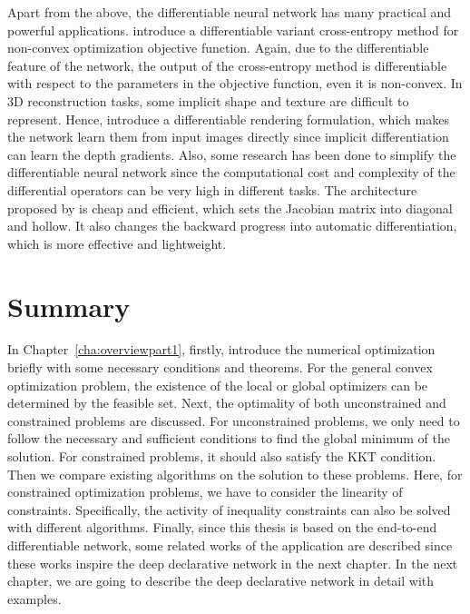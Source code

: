 \par Apart from the above, the differentiable neural network has many practical and powerful applications. \cite{AB:19} introduce a differentiable variant cross-entropy method for non-convex optimization objective function. Again, due to the differentiable feature of the network, the output of the cross-entropy method is differentiable with respect to the parameters in the objective function, even it is non-convex. In 3D reconstruction tasks, some implicit shape and texture are difficult to represent. Hence, \cite{NM:20} introduce a differentiable rendering formulation, which makes the network learn them from input images directly since implicit differentiation can learn the depth gradients. Also, some research has been done to simplify the differentiable neural network since the computational cost and complexity of the differential operators can be very high in different tasks. The architecture proposed by \cite{CR:19} is cheap and efficient, which sets the Jacobian matrix into diagonal and hollow. It also changes the backward progress into automatic differentiation, which is more effective and lightweight. 


\section{Summary}
\label{sec:2summary}
In Chapter~\ref{cha:overviewpart1}, firstly, introduce the numerical optimization briefly with some necessary conditions and theorems. For the general convex optimization problem, the existence of the local or global optimizers can be determined by the feasible set. Next, the optimality of both unconstrained and constrained problems are discussed. For unconstrained problems, we only need to follow the necessary and sufficient conditions to find the global minimum of the solution. For constrained problems, it should also satisfy the KKT condition. Then we compare existing algorithms on the solution to these problems. Here, for constrained optimization problems, we have to consider the linearity of constraints. Specifically, the activity of inequality constraints can also be solved with different algorithms. Finally, since this thesis is based on the end-to-end differentiable network, some related works of the application are described since these works inspire the deep declarative network in the next chapter. In the next chapter, we are going to describe the deep declarative network in detail with examples. 





